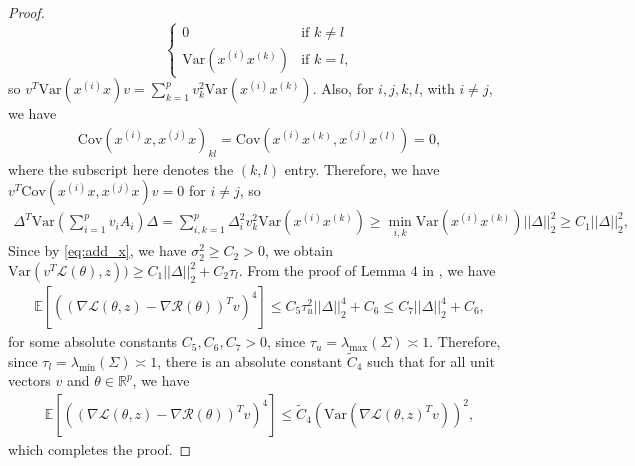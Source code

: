 \documentclass{article}
\begin{document}
\begin{proof}
\[\begin{cases}
      0 & \text{if $k \neq l$} \\
      \mathrm{Var}\left(x^{(i)}x^{(k)}\right) & \text{if $k = l$},
   \end{cases}
\]
so $v^T\mathrm{Var}\left(x^{(i)}x\right)v = \sum_{k = 1}^pv_k^2\mathrm{Var}\left(x^{(i)}x^{(k)}\right)$. Also, for $i, j, k, l$, with $i \neq j$, we have 
\begin{align*}
\mathrm{Cov}\left(x^{(i)}x, x^{(j)}x\right)_{kl} = \mathrm{Cov}\left(x^{(i)}x^{(k)}, x^{(j)}x^{(l)}\right) = 0,
\end{align*}
where the subscript here denotes the $(k, l)$ entry. Therefore, we have $v^T\mathrm{Cov}\left(x^{(i)}x, x^{(j)}x\right)v = 0$ for $i \neq j$, so
\begin{align*}
\Delta^T\mathrm{\mathrm{Var}}\left(\sum_{i = 1}^pv_i A_i\right)\Delta = \sum_{i, k = 1}^p\Delta_i^2v_k^2\mathrm{Var}\left(x^{(i)}x^{(k)}\right) \geq \mathop{\min}\limits_{i, k}\mathrm{Var}\left(x^{(i)}x^{(k)}\right)||\Delta||_2^2 \geq C_1||\Delta||_2^2,
\end{align*}
Since by \eqref{eq:add_x}, we have $\sigma_2^2 \geq C_2 > 0$, we obtain $\mathrm{Var}(v^T \mathcal{L}(\theta), z)) \geq C_1||\Delta||_2^2 + C_2\tau_l$. From the proof of Lemma $4$ in \cite{RE}, we have
\begin{align*}
\mathbb{E}\left[\left((\nabla \mathcal{L}(\theta, z) - \nabla\mathcal{R}(\theta))^Tv\right)^4\right] \leq C_5\tau_u^2||\Delta||_2^4 + C_6 \leq C_7||\Delta||_2^4 + C_6,
\end{align*}
for some absolute constants $C_5, C_6, C_7 > 0$, since $\tau_u = \lambda_{\max}(\Sigma) \asymp 1$. Therefore, since $\tau_l = \lambda_{\min}(\Sigma) \asymp 1$, there is an absolute constant $\widetilde{C}_4$ such that for all unit vectors $v$ and $\theta \in \mathbb{R}^p$, we have
\begin{align*}
\mathbb{E}\left[\left((\nabla \mathcal{L}(\theta, z) - \nabla\mathcal{R}(\theta))^Tv\right)^4\right] \leq  \widetilde{C}_4(\mathrm{Var}(\nabla \mathcal{L}(\theta, z)^Tv))^2,
\end{align*}
which completes the proof.
\end{proof}
\end{document}
